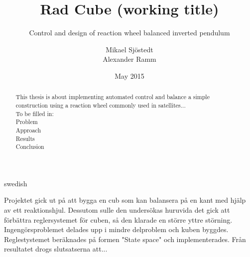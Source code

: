 \documentclass[a4paper,11pt]{kth-mag}
\title{Rad Cube (working title)}
\subtitle{Control and design of reaction wheel balanced inverted pendulum}
\author{Mikael Sjöstedt \\ Alexander Ramm}
\date{May 2015}
\begin{document}
%
\clearpage

\frontmatter
\pagestyle{plain}
{}
\maketitle
{}
\begin{abstract}
This thesis is about implementing automated control and balance a simple construction using a reaction wheel commonly used in satellites...
\\ To be filled in:
\\	Problem
\\	Approach %
\\	Results
\\ 	Conclusion


\end{abstract}
\cleardoublepage
\begin{foreignabstract}{swedish}
Projektet gick ut på att bygga en cub som kan balansera på en kant med hjälp av ett reaktionshjul. Dessutom sulle den undersökas huruvida det gick att förbättra reglersystemet
för cuben, så den klarade en större yttre störning. Ingengörsproblemet delades upp i mindre delproblem och kuben byggdes. Reglestystemet beräknades på formen "State space" och implementerades.
Från resultatet drogs slutsatserna att...
\\


\end{foreignabstract}
\clearpage
\end{document}

